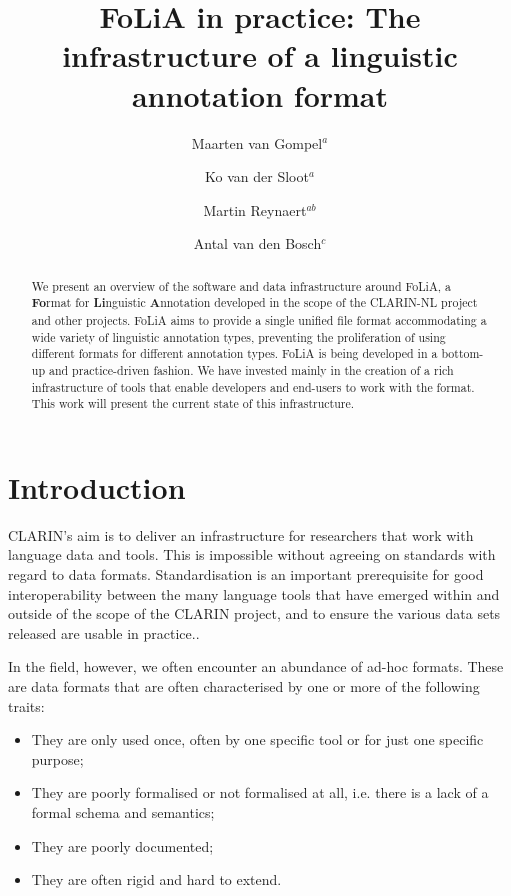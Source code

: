 \documentclass[a4paper,11pt]{article}
\begin{document}
\title{FoLiA in practice: The infrastructure of a linguistic annotation format}
\author{Maarten van Gompel$^a$ \and Ko van der
    Sloot$^a$ \and Martin Reynaert$^{ab}$ \and Antal van den Bosch$^c$} %
\date{}


\maketitle
\renewcommand{\thefootnote}{\alph{footnote}}
\renewcommand{\thefootnote}{\arabic{footnote}}

\begin{abstract}
We present an overview of the software and data infrastructure around FoLiA, a
\textbf{Fo}rmat for \textbf{Li}nguistic \textbf{A}nnotation developed in the
scope of the CLARIN-NL project and other projects.  FoLiA aims to provide a
single unified file format accommodating a wide variety of linguistic
annotation types, preventing the proliferation of using different formats for
different annotation types. FoLiA is being developed in a bottom-up and
practice-driven fashion.  We have invested mainly in the creation of a rich
infrastructure of tools that enable developers and end-users to work with the
format. This work will present the current state of this infrastructure.
\end{abstract}


\section{Introduction}

CLARIN's aim is to deliver an infrastructure for researchers that work with
language data and tools. This is impossible without agreeing on standards with
regard to data formats. Standardisation is an important prerequisite for good
interoperability between the many language tools that have emerged within and
outside of the scope of the CLARIN project, and to ensure the various data sets
released are usable in practice..

In the field, however, we often encounter an abundance of ad-hoc formats. These are
data formats that are often characterised by one or more of the following traits:

\begin{itemize}
    \item They are only used once, often by one specific tool or for just one specific purpose;
    \item They are poorly formalised or not formalised at all, i.e. there is a lack of a formal schema and semantics;
    \item They are poorly documented;
    \item They are often rigid and hard to extend.
\end{itemize}
\end{document}
